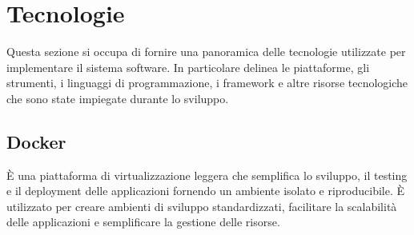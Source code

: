 \section{Tecnologie}
Questa sezione si occupa di fornire una panoramica delle tecnologie utilizzate per implementare il sistema software. In particolare delinea le piattaforme, gli strumenti, i linguaggi di programmazione, i framework e altre risorse tecnologiche che sono state impiegate durante lo sviluppo.

\subsection{Docker}
È una piattaforma di virtualizzazione leggera che semplifica lo sviluppo, il testing e il deployment delle applicazioni fornendo un ambiente isolato e riproducibile. È utilizzato per creare ambienti di sviluppo standardizzati, facilitare la scalabilità delle applicazioni e semplificare la gestione delle risorse. 
